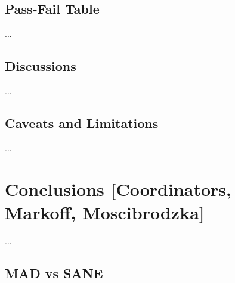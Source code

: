 \documentclass[twocolumn,tighten,dvipsnames,linenumbers]{aastex63}
\begin{document}




\subsection{Pass-Fail Table}
\label{sec:passfail}

...

\subsection{Discussions}
\label{sec:discussions}

...

\subsection{Caveats and Limitations}
\label{sec:caveats}

...

\section{Conclusions
  [Coordinators, Markoff, Moscibrodzka]}
\label{sec:conclusions}

...

\subsection{MAD vs SANE}
\end{document}
